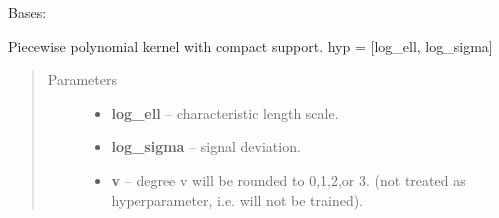 \documentclass[letterpaper,10pt,english]{sphinxmanual}
\begin{document}
\begin{fulllineitems}
\label{pyGPs.Core:pyGPs.Core.cov.PiecePoly}
Bases: {\hyperref[pyGPs.Core:pyGPs.Core.cov.Kernel]{}}

Piecewise polynomial kernel with compact support. 
hyp = {[}log\_ell, log\_sigma{]}
\begin{quote}\begin{description}
\item[{Parameters}] \leavevmode\begin{itemize}
\item {} 
\textbf{log\_ell} -- characteristic length scale.

\item {} 
\textbf{log\_sigma} -- signal deviation.

\item {} 
\textbf{v} -- degree v will be rounded to 0,1,2,or 3. (not treated as hyperparameter, i.e. will not be trained).

\end{itemize}

\end{description}\end{quote}

\begin{fulllineitems}
\label{pyGPs.Core:pyGPs.Core.cov.PiecePoly.dfunc}
\end{fulllineitems}


\begin{fulllineitems}
\label{pyGPs.Core:pyGPs.Core.cov.PiecePoly.dpp}
\end{fulllineitems}


\begin{fulllineitems}
\label{pyGPs.Core:pyGPs.Core.cov.PiecePoly.func}
\end{fulllineitems}



\end{fulllineitems}
\end{document}
